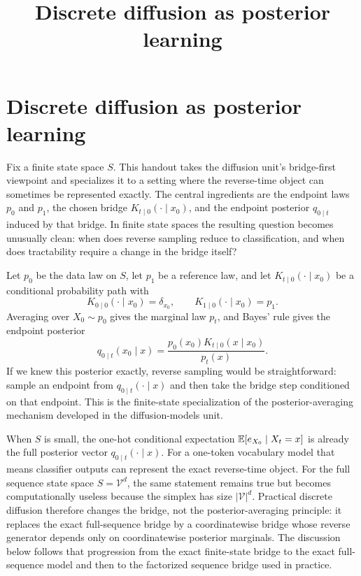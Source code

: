 \documentclass[11pt]{article}
\title{Discrete diffusion as posterior learning}
\author{}
\date{}
\begin{document}
\maketitle

\section[Discrete diffusion as posterior learning]{Discrete diffusion as posterior learning}
\label{sec:discrete-posterior-learning}

Fix a finite state space \(S\).
This handout takes the diffusion unit's bridge-first viewpoint and specializes it to a setting where the reverse-time object can sometimes be represented exactly.
The central ingredients are the endpoint laws \(p_0\) and \(p_1\), the chosen bridge \(K_{t\mid 0}(\cdot\mid x_0)\), and the endpoint posterior \(q_{0\mid t}\) induced by that bridge.
In finite state spaces the resulting question becomes unusually clean: when does reverse sampling reduce to classification, and when does tractability require a change in the bridge itself?

Let \(p_0\) be the data law on \(S\), let \(p_1\) be a reference law, and let \(K_{t\mid 0}(\cdot\mid x_0)\) be a conditional probability path with
\[
  K_{0\mid 0}(\cdot\mid x_0)=\delta_{x_0},
  \qquad
  K_{1\mid 0}(\cdot\mid x_0)=p_1.
\]
Averaging over \(X_0\sim p_0\) gives the marginal law \(p_t\), and Bayes' rule gives the endpoint posterior
\[
  q_{0\mid t}(x_0\mid x)
  =
  \frac{p_0(x_0)K_{t\mid 0}(x\mid x_0)}{p_t(x)}.
\]
If we knew this posterior exactly, reverse sampling would be straightforward:
sample an endpoint from \(q_{0\mid t}(\cdot\mid x)\) and then take the bridge step conditioned on that endpoint.
This is the finite-state specialization of the posterior-averaging mechanism developed in the diffusion-models unit.

When \(S\) is small, the one-hot conditional expectation \(\mathbb{E}[e_{X_0}\mid X_t=x]\) is already the full posterior vector \(q_{0\mid t}(\cdot\mid x)\).
For a one-token vocabulary model that means classifier outputs can represent the exact reverse-time object.
For the full sequence state space \(S=\mathcal{V}^d\), the same statement remains true but becomes computationally useless because the simplex has size \(|\mathcal{V}|^d\).
Practical discrete diffusion therefore changes the bridge, not the posterior-averaging principle: it replaces the exact full-sequence bridge by a coordinatewise bridge whose reverse generator depends only on coordinatewise posterior marginals.
The discussion below follows that progression from the exact finite-state bridge to the exact full-sequence model and then to the factorized sequence bridge used in practice.
\end{document}
